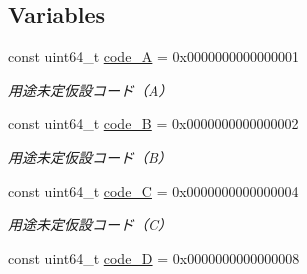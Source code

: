 \subsection*{Variables}
\begin{DoxyCompactItemize}
\item 
\mbox{\label{namespace_g_a_1_1code_aea44a30822438cf5e650b6d4bd20a613}} 
const uint64\+\_\+t \mbox{\hyperlink{namespace_g_a_1_1code_aea44a30822438cf5e650b6d4bd20a613}{code\+\_\+A}} = 0x00\textquotesingle{}00\textquotesingle{}00\textquotesingle{}00\textquotesingle{}00\textquotesingle{}00\textquotesingle{}00\textquotesingle{}01
\begin{DoxyCompactList}\small\item\em 用途未定仮設コード（\+A） \end{DoxyCompactList}\item 
\mbox{\label{namespace_g_a_1_1code_a12e9a9866e9e7410695ea6c79cb28e5a}} 
const uint64\+\_\+t \mbox{\hyperlink{namespace_g_a_1_1code_a12e9a9866e9e7410695ea6c79cb28e5a}{code\+\_\+B}} = 0x00\textquotesingle{}00\textquotesingle{}00\textquotesingle{}00\textquotesingle{}00\textquotesingle{}00\textquotesingle{}00\textquotesingle{}02
\begin{DoxyCompactList}\small\item\em 用途未定仮設コード（\+B） \end{DoxyCompactList}\item 
\mbox{\label{namespace_g_a_1_1code_aeea26333730c8856181257501823f1f3}} 
const uint64\+\_\+t \mbox{\hyperlink{namespace_g_a_1_1code_aeea26333730c8856181257501823f1f3}{code\+\_\+C}} = 0x00\textquotesingle{}00\textquotesingle{}00\textquotesingle{}00\textquotesingle{}00\textquotesingle{}00\textquotesingle{}00\textquotesingle{}04
\begin{DoxyCompactList}\small\item\em 用途未定仮設コード（\+C） \end{DoxyCompactList}\item 
\mbox{\label{namespace_g_a_1_1code_afbc3e5e443cf687d0486db2452b26031}} 
const uint64\+\_\+t \mbox{\hyperlink{namespace_g_a_1_1code_afbc3e5e443cf687d0486db2452b26031}{code\+\_\+D}} = 0x00\textquotesingle{}00\textquotesingle{}00\textquotesingle{}00\textquotesingle{}00\textquotesingle{}00\textquotesingle{}00\textquotesingle{}08

\end{DoxyCompactItemize}
